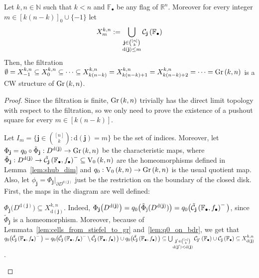 \begin{theorem}\label{thm:gr_is_cw} Let $k,n\in\mathbb{N}$ such that $k<n$ and $\mathbb{F}_{\bullet}$ be any flag of $\mathbb{R}^n$. Moreover for every integer $m\in[k(n-k)]_0\cup\{-1\}$ let \[X_m^{k,n}:=\bigcup_{\substack{\mathbf{j}\in\binom{[n]}{k}\\\mathrm{d}(\mathbf{j})\leq m}}\mathcal{C}_{\mathbf{j}}\left(\mathbb{F}_{\bullet}\right)\]
Then, the filtration $\emptyset=X_{-1}^{k,n}\subseteq X_0^{k,n}\subseteq\cdots\subseteq X_{k(n-k)}^{k,n}=X_{k(n-k)+1}^{k,n}=X_{k(n-k)+2}^{k,n}=\cdots=\Gr{k}{n}$ is a CW structure of $\Gr{k}{n}$.
\end{theorem}
\begin{proof}
Since the filtration is finite, $\Gr{k}{n}$ trivially has the direct limit topology with respect to the filtration, so we only need to prove the existence of a pushout square for every $m\in[k(n-k)]$.
\begin{center}
\end{center}
Let $I_m=\big\{\mathbf{j}\in\binom{[n]}{k}:\mathrm{d}(\mathbf{j})=m\big\}$ be the set of indices. Moreover, let $\Phi_{\mathbf{j}}=q_0\circ\tilde{\Phi}_{\mathbf{j}}:D^{\mathrm{d}(\mathbf{j})}\to \Gr{k}{n}$ be the characteristic maps, where $\tilde{\Phi}_{\mathbf{j}}:D^{\mathrm{d}(\mathbf{j})}\to\stcell{j}^-\subseteq\StO{k}{n}$ are the homeomorphisms defined in Lemma~\ref{lem:shub_dim} and $q_0:\StO{k}{n}\to\Gr{k}{n}$ is the usual quotient map. Also, let $\phi_{\mathbf{j}}=\Phi_{\mathbf{j}}|_{\partial D^{\mathrm{d}(\mathbf{j})}}$ just be the restriction on the boundary of the closed disk.
First, the maps in the diagram are well defined:
\begin{i_enum}
\item $\Phi_{\mathbf{j}}\big(D^{\mathrm{d}(\mathbf{j})}\big)\subseteq X_{\mathrm{d}(\mathbf{j})}^{k,n}$. Indeed, $\Phi_{\mathbf{j}}\big(D^{\mathrm{d}(\mathbf{j})}\big)=q_0\big(\tilde{\Phi}_{\mathrm{j}}(D^{\mathrm{d}(\mathbf{j})})\big)=q_0\big(\tilde{\mathcal{C}}_{\mathbf{j}}\left(\mathbb{F}_{\bullet},f_{\bullet}\right)^-\big)$, since $\tilde{\Phi}_{\mathbf{j}}$ is a homeomorphism. Moreover, because of Lemmata~\ref{lem:cells_from_stiefel_to_gr} and~\ref{lem:q0_on_bdr}, we get that $q_0\big(\tilde{\mathcal{C}}_{\mathbf{j}}\left(\mathbb{F}_{\bullet},f_{\bullet}\right)^-\big)=q_0\big(\tilde{\mathcal{C}}_{\mathbf{j}}\left(\mathbb{F}_{\bullet},f_{\bullet}\right)^-\setminus\tilde{\mathcal{C}}_{\mathbf{j}}\left(\mathbb{F}_{\bullet},f_{\bullet}\right)\big)\cup q_0\big(\tilde{\mathcal{C}}_{\mathbf{j}}\left(\mathbb{F}_{\bullet},f_{\bullet}\right)\big)\subseteq\bigcup_{\substack{\mathbf{j}'\in\binom{[n]}{k}\\\mathrm{d}(\mathbf{j}')<\mathrm{d}(\mathbf{j})}}\mathcal{C}_{\mathbf{j'}}\left(\mathbb{F}_{\bullet}\right)\cup\mathcal{C}_{\mathbf{j}}\left(\mathbb{F}_{\bullet}\right)\subseteq X_{\mathrm{d}(\mathbf{j})}^{k,n}$.

\end{i_enum}
\end{proof}
